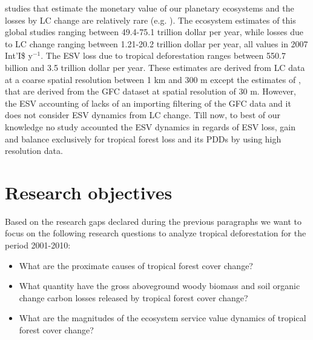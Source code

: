 studies that estimate the monetary value of our planetary ecosystems and the losses by \ac{LC} change are relatively rare (e.g. \citet{Costanza1997,Costanza2014,Sannigrahi2018,Song2018}). The ecosystem estimates of this global studies ranging between 49.4-75.1 trillion dollar per year, while losses due to \ac{LC} change ranging between 1.21-20.2 trillion dollar per year, all values in 2007 Int'I\$ y$^{-1}$. The \ac{ESV} loss due to tropical deforestation ranges between 550.7 billion and 3.5 trillion dollar per year. These estimates are derived from \ac{LC} data at a coarse spatial resolution between 1 km and 300 m except the estimates of \citeauthor{Song2018}, that are derived from the \ac{GFC} dataset at spatial resolution of 30 m. However, the \ac{ESV} accounting of \citeauthor{Song2018} lacks of an importing filtering of the \ac{GFC} data and it does not consider \ac{ESV} dynamics from \ac{LC} change. Till now, to best of our knowledge no study accounted the \ac{ESV} dynamics in regards of \ac{ESV} loss, gain and balance exclusively for tropical forest loss and its \acp{PDD} by using high resolution data.

	\section{Research objectives}
		Based on the research gaps declared during the previous paragraphs we want to focus on the following research questions to analyze tropical deforestation for the period 2001-2010:
		\begin{itemize}
			\item What are the proximate causes of tropical forest cover change?
			\item What quantity have the gross aboveground woody biomass and soil organic change carbon losses released by tropical forest cover change?
			\item What are the magnitudes of the ecosystem service value dynamics of tropical forest cover change?
		\end{itemize}

